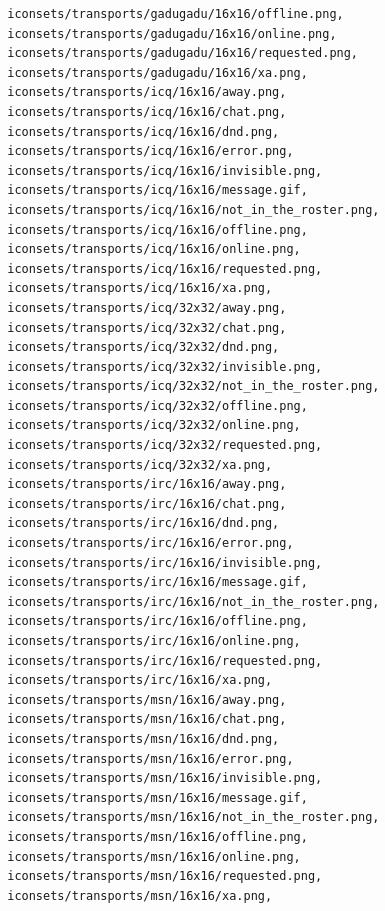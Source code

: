 \documentclass[a4paper]{article}
\begin{document}
\begin{verbatim}
              iconsets/transports/gadugadu/16x16/offline.png,
              iconsets/transports/gadugadu/16x16/online.png,
              iconsets/transports/gadugadu/16x16/requested.png,
              iconsets/transports/gadugadu/16x16/xa.png,
              iconsets/transports/icq/16x16/away.png,
              iconsets/transports/icq/16x16/chat.png,
              iconsets/transports/icq/16x16/dnd.png,
              iconsets/transports/icq/16x16/error.png,
              iconsets/transports/icq/16x16/invisible.png,
              iconsets/transports/icq/16x16/message.gif,
              iconsets/transports/icq/16x16/not_in_the_roster.png,
              iconsets/transports/icq/16x16/offline.png,
              iconsets/transports/icq/16x16/online.png,
              iconsets/transports/icq/16x16/requested.png,
              iconsets/transports/icq/16x16/xa.png,
              iconsets/transports/icq/32x32/away.png,
              iconsets/transports/icq/32x32/chat.png,
              iconsets/transports/icq/32x32/dnd.png,
              iconsets/transports/icq/32x32/invisible.png,
              iconsets/transports/icq/32x32/not_in_the_roster.png,
              iconsets/transports/icq/32x32/offline.png,
              iconsets/transports/icq/32x32/online.png,
              iconsets/transports/icq/32x32/requested.png,
              iconsets/transports/icq/32x32/xa.png,
              iconsets/transports/irc/16x16/away.png,
              iconsets/transports/irc/16x16/chat.png,
              iconsets/transports/irc/16x16/dnd.png,
              iconsets/transports/irc/16x16/error.png,
              iconsets/transports/irc/16x16/invisible.png,
              iconsets/transports/irc/16x16/message.gif,
              iconsets/transports/irc/16x16/not_in_the_roster.png,
              iconsets/transports/irc/16x16/offline.png,
              iconsets/transports/irc/16x16/online.png,
              iconsets/transports/irc/16x16/requested.png,
              iconsets/transports/irc/16x16/xa.png,
              iconsets/transports/msn/16x16/away.png,
              iconsets/transports/msn/16x16/chat.png,
              iconsets/transports/msn/16x16/dnd.png,
              iconsets/transports/msn/16x16/error.png,
              iconsets/transports/msn/16x16/invisible.png,
              iconsets/transports/msn/16x16/message.gif,
              iconsets/transports/msn/16x16/not_in_the_roster.png,
              iconsets/transports/msn/16x16/offline.png,
              iconsets/transports/msn/16x16/online.png,
              iconsets/transports/msn/16x16/requested.png,
              iconsets/transports/msn/16x16/xa.png,

\end{verbatim}
\end{document}
